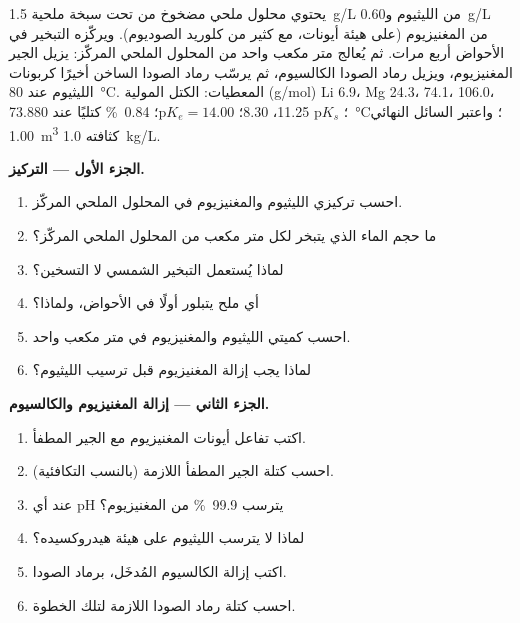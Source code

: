 \begin{problem}
\label{pb:b1:s-block:1}
يحتوي محلول ملحي مضخوخ من تحت سبخة ملحية \qty{1.5}{g/L} من الليثيوم
و\qty{0.60}{g/L} من المغنيزيوم (على هيئة أيونات، مع كثير من كلوريد الصوديوم).
ويركّزه التبخير في الأحواض أربع مرات. ثم يُعالج متر مكعب واحد من
المحلول الملحي المركّز: يزيل الجير المغنيزيوم، ويزيل رماد الصودا
الكالسيوم، ثم يرسّب رماد الصودا الساخن أخيرًا كربونات الليثيوم عند
\qty{80}{\celsius}. المعطيات: الكتل المولية (\unit{g/mol}) Li 6.9، Mg 24.3،
 74.1،  106.0،  73.8؛ $\mathrm{p}K_s$
 11.25،  8.30؛ $\mathrm{p}K_e = 14.00$؛ 
 \qty{0.84}{\percent} كتليًا عند \qty{80}{\celsius}؛ واعتبر
السائل النهائي \qty{1.00}{m^3} كثافته \qty{1.0}{kg/L}.

\medskip
\noindent\textbf{الجزء الأول --- التركيز.}
\begin{enumerate}
  \item احسب تركيزي الليثيوم والمغنيزيوم في المحلول الملحي
        المركّز.
  \item ما حجم الماء الذي يتبخر لكل متر مكعب من المحلول الملحي
        المركّز؟
  \item لماذا يُستعمل التبخير الشمسي لا التسخين؟
  \item أي ملح يتبلور أولًا في الأحواض، ولماذا؟
  \item احسب كميتي الليثيوم والمغنيزيوم في متر مكعب واحد.
  \item لماذا يجب إزالة المغنيزيوم قبل ترسيب الليثيوم؟
\end{enumerate}

\medskip
\noindent\textbf{الجزء الثاني --- إزالة المغنيزيوم والكالسيوم.}
\begin{enumerate}[resume]
  \item اكتب تفاعل أيونات المغنيزيوم مع الجير المطفأ.
  \item احسب كتلة الجير المطفأ اللازمة (بالنسب التكافئية).
  \item عند أي pH يترسب \qty{99.9}{\percent} من المغنيزيوم؟
  \item لماذا لا يترسب الليثيوم على هيئة هيدروكسيده؟
  \item اكتب إزالة الكالسيوم المُدخَل، برماد الصودا.
  \item احسب كتلة رماد الصودا اللازمة لتلك الخطوة.
\end{enumerate}


\end{problem}
